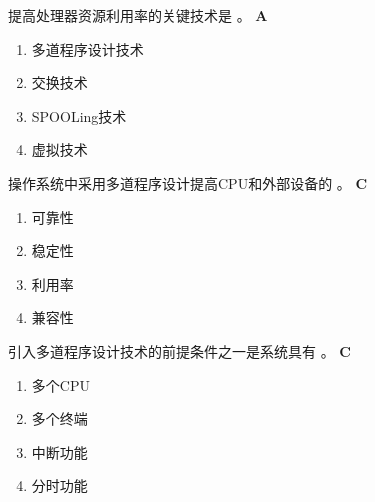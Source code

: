 \begin{problem}
	提高处理器资源利用率的关键技术是 \myline。
	\textbf{A}
	\vspace{-0.5em}
	\begin{multicols}{4}
		\begin{enumerate}[label=\Alph*.]
			\item 多道程序设计技术
			\item 交换技术
			\item SPOOLing技术
			\item 虚拟技术
		\end{enumerate}
	\end{multicols}
	\vspace{-1em}
\end{problem}



\begin{problem}
	操作系统中采用多道程序设计提高CPU和外部设备的 \myline。
	\textbf{C}
	\vspace{-0.5em}
	\begin{multicols}{4}
		\begin{enumerate}[label=\Alph*.]
			\item 可靠性
			\item 稳定性
			\item 利用率
			\item 兼容性
		\end{enumerate}
	\end{multicols}
	\vspace{-1em}
\end{problem}


\begin{problem}
	引入多道程序设计技术的前提条件之一是系统具有 \myline。
	\textbf{C}
	\vspace{-0.5em}
	\begin{multicols}{4}
		\begin{enumerate}[label=\Alph*.]
			\item 多个CPU
			\item 多个终端
			\item 中断功能
			\item 分时功能
		\end{enumerate}
	\end{multicols}
	\vspace{-1em}
\end{problem}



